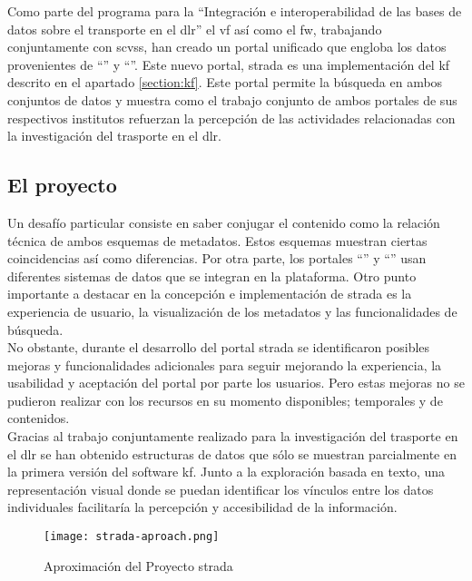 Como parte del programa para la ``Integración e interoperabilidad de las bases de datos sobre el transporte en el \gls{dlr}'' el \gls{vf} así como el \gls{fw}, trabajando conjuntamente con \gls{scvss}, han creado un portal unificado que engloba los datos provenientes de ``\cs'' y ``\mo''. Este nuevo portal, \gls{strada} es una implementación del \gls{kf}  descrito en el apartado \ref{section:kf}. Este portal permite la búsqueda en ambos conjuntos de datos y muestra como el trabajo conjunto de ambos portales de sus respectivos institutos refuerzan la percepción de las actividades relacionadas con la investigación del trasporte en el \gls{dlr}.\\



\subsection{El proyecto \stradai}
Un desafío particular consiste en saber conjugar el contenido como la relación técnica de ambos esquemas de \glspl{metadato}. Estos esquemas muestran ciertas coincidencias así como diferencias. Por otra parte, los portales ``\cs'' y ``\mo'' usan diferentes sistemas de datos que se integran en la plataforma. Otro punto importante a destacar en la concepción e implementación de \gls{strada} es la experiencia de usuario, la visualización de los \glspl{metadato}  y las funcionalidades de búsqueda.\\

No obstante, durante el desarrollo del portal \gls{strada} se identificaron posibles mejoras y funcionalidades adicionales para seguir mejorando la experiencia, la usabilidad y aceptación del portal por parte los usuarios. Pero estas mejoras no se pudieron realizar con los recursos en su momento disponibles; temporales y de contenidos.\\

Gracias al trabajo conjuntamente realizado para la investigación del trasporte en el \gls{dlr} se han obtenido estructuras de datos que sólo se muestran parcialmente en la primera versión del \gls{software} \gls{kf}. Junto a la exploración basada en texto, una representación visual donde se puedan identificar los vínculos entre los datos individuales facilitaría la percepción y accesibilidad de la información.\\

\begin{figure}[h!]
  \centering
     \texttt{[image: strada-aproach.png]}
  \caption{Aproximación del Proyecto \gls{strada} \cite{dublinstrada2}}
\end{figure}

